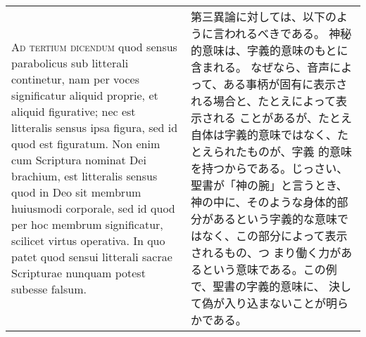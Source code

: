\documentclass[10pt]{jsarticle} %
\begin{document}
\begin{longtable}{p{21em}p{21em}}
\\


{\scshape Ad tertium dicendum} quod sensus parabolicus
sub litterali continetur, nam per voces significatur aliquid proprie, et
aliquid figurative; nec est litteralis sensus ipsa figura, sed id quod
est figuratum. Non enim cum Scriptura nominat Dei brachium, est
litteralis sensus quod in Deo sit membrum huiusmodi corporale, sed id
quod per hoc membrum significatur, scilicet virtus operativa. In quo
patet quod sensui litterali sacrae Scripturae nunquam potest subesse
falsum.


&

第三異論に対しては、以下のように言われるべきである。
神秘的意味は、字義的意味のもとに含まれる。
なぜなら、音声によって、ある事柄が固有に表示される場合と、たとえによって表示される
 ことがあるが、たとえ自体は字義的意味ではなく、たとえられたものが、字義
 的意味を持つからである。じっさい、聖書が「神の腕」と言うとき、神の中に、そのような身体的部
 分があるという字義的な意味ではなく、この部分によって表示されるもの、つ
 まり働く力があるという意味である。この例で、聖書の字義的意味に、
 決して偽が入り込まないことが明らかである。


\end{longtable}
\end{document}
